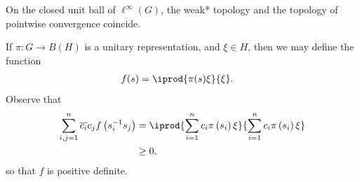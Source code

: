 \documentclass[10pt]{mypackage}
\begin{document}
On the closed unit ball of $\ell^{\infty}\left( G \right)$, the weak* topology and the topology of pointwise convergence coincide.

If $\pi\colon G\rightarrow B\left( H \right)$ is a unitary representation, and $\xi\in H$, then we may define the function
\begin{align*}
  f(s) &= \iprod{\pi(s)\xi}{\xi}.
\end{align*}
Observe that
\begin{align*}
  \sum_{i,j=1}^{n} \overline{c_i}c_j f\left( s_i^{-1}s_j \right) &= \iprod{\sum_{i=1}^{n}c_i\pi\left( s_i \right)\xi}{\sum_{i=1}^{n}c_i\pi\left( s_i \right)\xi}\\
                                                                 &\geq 0,
\end{align*}
so that $f$ is positive definite.
\end{document}

